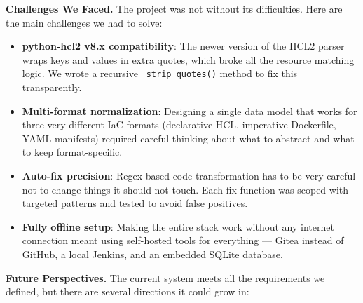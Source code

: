 
\vspace{0.3cm}
\noindent\textbf{Challenges We Faced.}\quad
The project was not without its difficulties. Here are the main challenges we had to solve:

\begin{itemize}[leftmargin=1.5cm]
  \item \textbf{python-hcl2 v8.x compatibility}: The newer version of the HCL2 parser wraps keys and values in extra quotes, which broke all the resource matching logic. We wrote a recursive \texttt{\_strip\_quotes()} method to fix this transparently.
  
  \item \textbf{Multi-format normalization}: Designing a single data model that works for three very different IaC formats (declarative HCL, imperative Dockerfile, YAML manifests) required careful thinking about what to abstract and what to keep format-specific.
  
  \item \textbf{Auto-fix precision}: Regex-based code transformation has to be very careful not to change things it should not touch. Each fix function was scoped with targeted patterns and tested to avoid false positives.
  
  \item \textbf{Fully offline setup}: Making the entire stack work without any internet connection meant using self-hosted tools for everything --- Gitea instead of GitHub, a local Jenkins, and an embedded SQLite database.
\end{itemize}


\vspace{0.3cm}
\noindent\textbf{Future Perspectives.}\quad
The current system meets all the requirements we defined, but there are several directions it could grow in:

